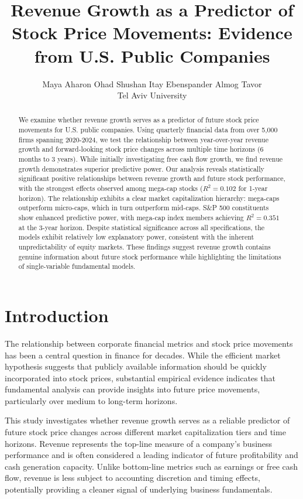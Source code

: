 \documentclass[11pt]{article}
\title{Revenue Growth as a Predictor of Stock Price Movements: Evidence from U.S. Public Companies}
\author{Maya Aharon \quad Ohad Shushan \quad Itay Ebenspander \quad Almog Tavor \\
        Tel Aviv University \\}
\begin{document}
\maketitle
\begin{abstract}
We examine whether revenue growth serves as a predictor of future stock price movements for U.S. public companies. Using quarterly financial data from over 5,000 firms spanning 2020-2024, we test the relationship between year-over-year revenue growth and forward-looking stock price changes across multiple time horizons (6 months to 3 years). While initially investigating free cash flow growth, we find revenue growth demonstrates superior predictive power. Our analysis reveals statistically significant positive relationships between revenue growth and future stock performance, with the strongest effects observed among mega-cap stocks ($R^2 = 0.102$ for 1-year horizon). The relationship exhibits a clear market capitalization hierarchy: mega-caps outperform micro-caps, which in turn outperform mid-caps. S\&P 500 constituents show enhanced predictive power, with mega-cap index members achieving $R^2 = 0.351$ at the 3-year horizon. Despite statistical significance across all specifications, the models exhibit relatively low explanatory power, consistent with the inherent unpredictability of equity markets. These findings suggest revenue growth contains genuine information about future stock performance while highlighting the limitations of single-variable fundamental models.
\end{abstract}

\section{Introduction}

The relationship between corporate financial metrics and stock price movements has been a central question in finance for decades. While the efficient market hypothesis suggests that publicly available information should be quickly incorporated into stock prices, substantial empirical evidence indicates that fundamental analysis can provide insights into future price movements, particularly over medium to long-term horizons.

This study investigates whether revenue growth serves as a reliable predictor of future stock price changes across different market capitalization tiers and time horizons. Revenue represents the top-line measure of a company's business performance and is often considered a leading indicator of future profitability and cash generation capacity. Unlike bottom-line metrics such as earnings or free cash flow, revenue is less subject to accounting discretion and timing effects, potentially providing a cleaner signal of underlying business fundamentals.
\end{document}
